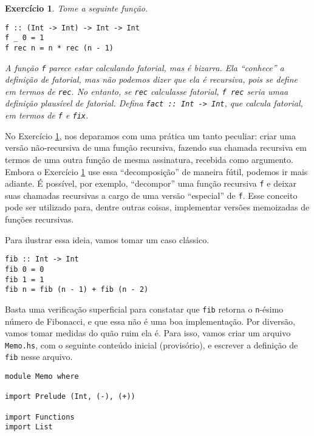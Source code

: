 \documentclass[a4paper]{article}
\newtheorem{exercicio}{Exercício}
\begin{document}
\begin{exercicio}	\label{exercicioFixFactorial}
	Tome a seguinte função.
\begin{verbatim}
f :: (Int -> Int) -> Int -> Int
f _ 0 = 1
f rec n = n * rec (n - 1)
\end{verbatim}
A função \emph{\texttt{f}} parece estar calculando fatorial, mas é bizarra.
Ela ``conhece'' a definição de fatorial, mas não podemos dizer que ela é recursiva, pois se define em termos de \emph{\texttt{rec}}.
No entanto, se \emph{\texttt{rec}} calculasse fatorial, \emph{\texttt{f rec}} seria umaa definição plausível de fatorial.
Defina \mbox{\emph{\texttt{fact :: Int -> Int}}}, que calcula fatorial, em termos de \emph{\texttt{f}} e \emph{\texttt{fix}}.
\end{exercicio}

No Exercício \ref{exercicioFixFactorial}, nos deparamos com uma prática um tanto peculiar: criar uma versão não-recursiva de uma função recursiva, fazendo sua chamada recursiva em termos de uma outra função de mesma assinatura, recebida como argumento.
Embora o Exercício \ref{exercicioFixFactorial} use essa ``decomposição'' de maneira fútil, podemos ir mais adiante.
É possível, por exemplo, ``decompor'' uma função recursiva \texttt{f} e deixar suas chamadas recursivas a cargo de uma versão ``especial'' de \texttt{f}.
Esse conceito pode ser utilizado para, dentre outras coisas, implementar versões memoizadas de funções recursivas.

Para ilustrar essa ideia, vamos tomar um caso clássico.

\begin{verbatim}
fib :: Int -> Int
fib 0 = 0
fib 1 = 1
fib n = fib (n - 1) + fib (n - 2)
\end{verbatim}

Basta uma verificação superficial para constatar que \texttt{fib} retorna o \texttt{n}-ésimo número de Fibonacci, e que essa não é uma boa implementação.
Por diversão, vamos tomar medidas do quão ruim ela é.
Para isso, vamos criar um arquivo \texttt{Memo.hs}, com o seguinte conteúdo inicial (provisório), e escrever a definição de \texttt{fib} nesse arquivo.

\begin{verbatim}
module Memo where

import Prelude (Int, (-), (+))

import Functions
import List
\end{verbatim}
\end{document}
